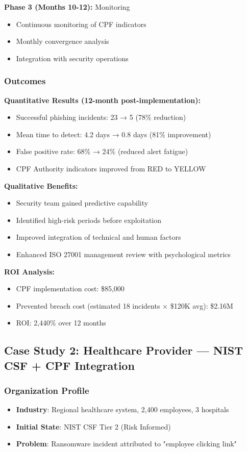 \documentclass[11pt,a4paper]{article}
\begin{document}
\textbf{Phase 3 (Months 10-12):} Monitoring
\begin{itemize}
\item Continuous monitoring of CPF indicators
\item Monthly convergence analysis
\item Integration with security operations
\end{itemize}

\subsubsection{Outcomes}

\textbf{Quantitative Results (12-month post-implementation):}
\begin{itemize}
\item Successful phishing incidents: 23 → 5 (78\% reduction)
\item Mean time to detect: 4.2 days → 0.8 days (81\% improvement)
\item False positive rate: 68\% → 24\% (reduced alert fatigue)
\item CPF Authority indicators improved from RED to YELLOW
\end{itemize}

\textbf{Qualitative Benefits:}
\begin{itemize}
\item Security team gained predictive capability
\item Identified high-risk periods before exploitation
\item Improved integration of technical and human factors
\item Enhanced ISO 27001 management review with psychological metrics
\end{itemize}

\textbf{ROI Analysis:}
\begin{itemize}
\item CPF implementation cost: \$85,000
\item Prevented breach cost (estimated 18 incidents × \$120K avg): \$2.16M
\item ROI: 2,440\% over 12 months
\end{itemize}

\subsection{Case Study 2: Healthcare Provider --- NIST CSF + CPF Integration}

\subsubsection{Organization Profile}
\begin{itemize}
\item \textbf{Industry}: Regional healthcare system, 2,400 employees, 3 hospitals
\item \textbf{Initial State}: NIST CSF Tier 2 (Risk Informed)
\item \textbf{Problem}: Ransomware incident attributed to "employee clicking link"
\end{itemize}
\end{document}
